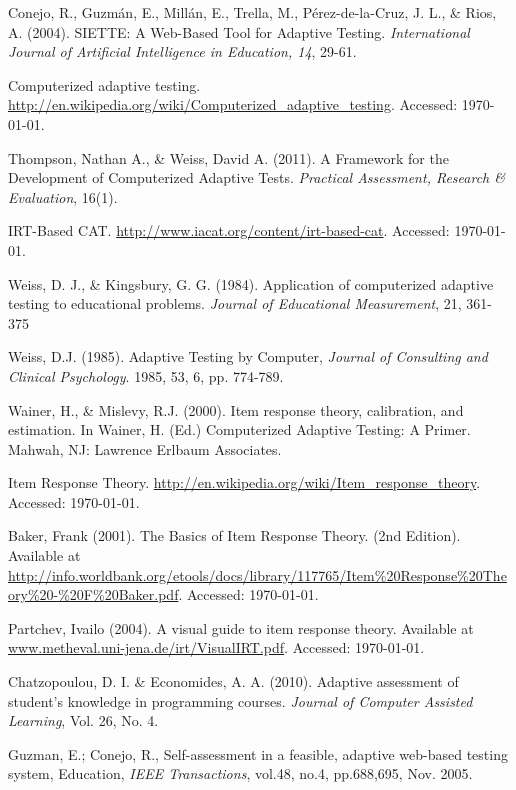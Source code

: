 \begin{thebibliography}{9}

 Conejo, R., Guzmán, E., Millán, E., Trella, M., Pérez-de-la-Cruz, J. L., \& Rios, A. (2004). SIETTE: A Web-Based Tool for Adaptive Testing. \textit{International Journal of Artificial Intelligence in Education, 14}, 29-61.

 Computerized adaptive testing. \url{http://en.wikipedia.org/wiki/Computerized_adaptive_testing}. Accessed: \today.

 Thompson, Nathan A., \& Weiss, David A. (2011). A Framework for the Development of Computerized Adaptive Tests. \textit{Practical Assessment, Research \& Evaluation}, 16(1).

 IRT-Based CAT. \url{http://www.iacat.org/content/irt-based-cat}. Accessed: \today.

 Weiss, D. J., \& Kingsbury, G. G. (1984). Application of computerized adaptive testing to educational problems. \textit{Journal of Educational Measurement}, 21, 361-375

 Weiss, D.J. (1985). Adaptive Testing by Computer, \textit{Journal of Consulting and Clinical Psychology}. 1985, 53, 6, pp. 774-789.

 Wainer, H., \& Mislevy, R.J. (2000). Item response theory, calibration, and estimation. In Wainer, H. (Ed.) Computerized Adaptive Testing: A Primer. Mahwah, NJ: Lawrence Erlbaum Associates.

 Item Response Theory. \url{http://en.wikipedia.org/wiki/Item_response_theory}. Accessed: \today.

 Baker, Frank (2001). The Basics of Item Response Theory. (2nd Edition). Available at \url{http://info.worldbank.org/etools/docs/library/117765/Item\%20Response\%20Theory\%20-\%20F\%20Baker.pdf}. Accessed: \today.

 Partchev, Ivailo (2004). A visual guide to item response theory. Available at \url{www.metheval.uni-jena.de/irt/VisualIRT.pdf}. Accessed: \today.

 Chatzopoulou, D. I. \& Economides, A. A. (2010). Adaptive assessment of student's knowledge in programming courses. \textit{Journal of Computer Assisted Learning}, Vol. 26, No. 4.

 Guzman, E.; Conejo, R., Self-assessment in a feasible, adaptive web-based testing system, Education, \textit{IEEE Transactions}, vol.48, no.4, pp.688,695, Nov. 2005.


\end{thebibliography}
